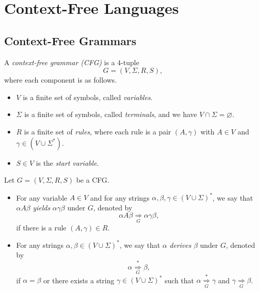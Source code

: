 \chapter{Context-Free Languages}
\section{Context-Free Grammars}
\begin{definition}
  A \emph{context-free grammar (CFG)} is a $4$-tuple
  \begin{equation*}
    G = (V, \Sigma, R, S),
  \end{equation*}
  where each component is as follows.
  \begin{itemize}
    \item $V$ is a finite set of symbols, called \emph{variables}.
    \item $\Sigma$ is a finite set of symbols, called \emph{terminals}, and we
    have $V \cap \Sigma = \varnothing$.
    \item $R$ is a finite set of \emph{rules}, where each rule is a pair
    $(A, \gamma)$ with $A \in V$ and $\gamma \in (V \cup \Sigma^*)$.
    \item $S \in V$ is the \emph{start variable}.
  \end{itemize}
\end{definition}

\begin{definition}
  Let $G = (V, \Sigma, R, S)$ be a CFG.
  \begin{itemize}
    \item For any variable $A \in V$ and for any strings
    $\alpha, \beta, \gamma \in (V \cup \Sigma)^*$, we say that $\alpha A \beta$
    \emph{yields} $\alpha\gamma\beta$ under $G$, denoted by
    \begin{equation*}
      \alpha A \beta \mathrel{\mathop\Rightarrow\limits_G} \alpha\gamma\beta,
    \end{equation*}
    if there is a rule $(A, \gamma) \in R$.
    \item For any strings $\alpha, \beta \in (V \cup \Sigma)^*$, we say that
    $\alpha$ \emph{derives} $\beta$ under $G$, denoted by
    \begin{equation*}
      \alpha \mathrel{\mathop\Rightarrow\limits_G^*} \beta,
    \end{equation*}
    if $\alpha = \beta$ or there exists a string $\gamma \in (V \cup \Sigma)^*$
    such that $\alpha \mathrel{\mathop\Rightarrow\limits_G^*} \gamma$ and
    $\gamma \mathrel{\mathop\Rightarrow\limits_G} \beta$.
  \end{itemize}
\end{definition}

